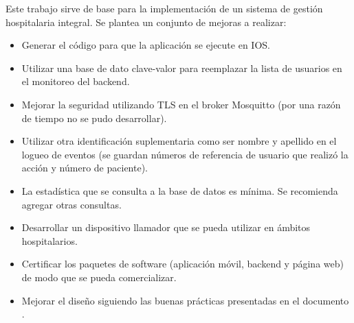 
Este trabajo sirve de base para la implementación de un sistema de gestión hospitalaria integral. Se plantea un conjunto de mejoras a realizar:

\begin{itemize}
\item Generar el código para que la aplicación se ejecute en IOS.
\item Utilizar una base de dato clave-valor para reemplazar la lista de usuarios en el monitoreo del backend.
\item Mejorar la seguridad utilizando TLS en el broker Mosquitto (por una razón de tiempo no se pudo desarrollar).
\item Utilizar otra identificación suplementaria como ser nombre y apellido en el logueo de eventos (se guardan números de referencia de usuario que realizó la acción y número de paciente). 
\item La estadística que se consulta a la base de datos es mínima. Se recomienda agregar otras consultas.
\item Desarrollar un dispositivo llamador que se pueda utilizar en ámbitos hospitalarios.
\item Certificar los paquetes de software (aplicación móvil, backend y página web) de modo que se pueda comercializar.
\item Mejorar el diseño siguiendo las buenas prácticas presentadas en el documento \citep{BOOK:3}.

\end{itemize}
